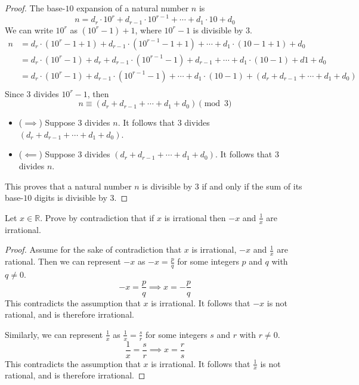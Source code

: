 \begin{solutions*}
    \fixlistskip
    \begin{proof}
    The base-$10$ expansion of a natural number $n$ is 
    \[
    n = d_r \cdot 10^r + d_{r-1} \cdot 10^{r-1} + \cdots + d_1 \cdot 10 + d_0
    \]
    We can write $10^r$ as $(10^r - 1) + 1$, where $10^r - 1$ is divisible by $3$.
    \begin{align*}
        n &= d_r \cdot (10^r - 1 + 1) + d_{r-1} \cdot (10^{r-1}-1 + 1) + \cdots + d_1 \cdot (10 - 1 + 1) + d_0\\
        &= d_r \cdot (10^r - 1) + d_r + d_{r-1} \cdot (10^{r-1}-1) + d_{r-1} + \cdots + d_1 \cdot (10-1) + d1 + d_0 \\
        &= d_r \cdot (10^r - 1) + d_{r-1} \cdot (10^{r-1}-1) + \cdots + d_1 \cdot (10-1) + (d_r + d_{r-1} + \cdots + d_1 + d_0) \\
    \end{align*}
    Since $3$ divides $10^r - 1$, then 
    \[n \equiv (d_r + d_{r-1} + \cdots + d_1 + d_0) \pmod{3}\]
    \begin{itemize}
        \item ($\implies$) Suppose $3$ divides $n$. It follows that $3$ divides $(d_r + d_{r-1} + \cdots + d_1 + d_0)$.
        \item ($\impliedby$) Suppose $3$ divides $(d_r + d_{r-1} + \cdots + d_1 + d_0)$. It follows that $3$ divides $n$.
    \end{itemize}
    This proves that a natural number $n$ is divisible by $3$ if and only if the sum of its base-$10$ digits is divisible by $3$.
    \end{proof}
\end{solutions*}

\begin{exercise}
\label{exNegationAndReciprocalOfIrrationalNumbers}
Let $x \in \mathbb{R}$. Prove by contradiction that if $x$ is irrational then $-x$ and $\frac{1}{x}$ are irrational.
\end{exercise}

\begin{solutions*}
    \fixlistskip
    \begin{proof}
    Assume for the sake of contradiction that $x$ is irrational, $-x$ and $\frac{1}{x}$ are rational. Then we can represent $-x$ as $-x = \frac{p}{q}$ for some integers $p$ and $q$ with $q \ne 0$. 
    \[-x = \frac{p}{q} \implies x = -\frac{p}{q}\]
    This contradicts the assumption that $x$ is irrational. It follows that $-x$ is not rational, and is therefore irrational.

    Similarly, we can represent $\frac{1}{x}$ as $\frac{1}{x} = \frac{s}{r}$ for some integers $s$ and $r$ with $r \ne 0$. 
    \[\frac{1}{x} = \frac{s}{r} \implies x = \frac{r}{s}\]
    This contradicts the assumption that $x$ is irrational. It follows that $\frac{1}{x}$ is not rational, and is therefore irrational.
    \end{proof}
\end{solutions*}

